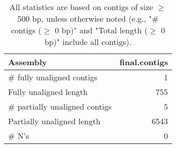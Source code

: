 \documentclass[12pt,a4paper]{article}
\begin{document}
\begin{table}[ht]
\begin{center}
\caption{All statistics are based on contigs of size $\geq$ 500 bp, unless otherwise noted (e.g., "\# contigs ($\geq$ 0 bp)" and "Total length ($\geq$ 0 bp)" include all contigs).}
\begin{tabular}{|l*{1}{|r}|}
\hline
Assembly & final.contigs \\ \hline
\# fully unaligned contigs & 1 \\ \hline
Fully unaligned length & 755 \\ \hline
\# partially unaligned contigs & 5 \\ \hline
Partially unaligned length & 6543 \\ \hline
\# N's & 0 \\ \hline
\end{tabular}
\end{center}
\end{table}
\end{document}
